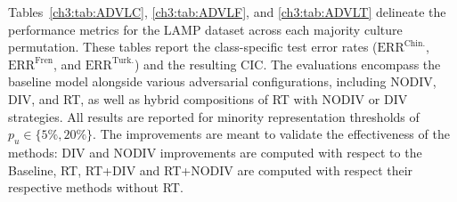 \label{ch3:sec:res:discr}
Tables~\ref{ch3:tab:ADVLC}, \ref{ch3:tab:ADVLF}, and \ref{ch3:tab:ADVLT} delineate the performance metrics for the LAMP dataset across each majority culture permutation. 
These tables report the class-specific test error rates ($\text{ERR}^{\text{Chin.}}$, $\text{ERR}^{\text{Fren}}$, and $\text{ERR}^{\text{Turk.}}$) and the resulting CIC. 
The evaluations encompass the baseline model alongside various adversarial configurations, including NODIV, DIV, and RT, as well as hybrid compositions of RT with NODIV or DIV strategies. 
All results are reported for minority representation thresholds of $p_u \in \{5\%, 20\%\}$.
The improvements are meant to validate the effectiveness of the methods: DIV and NODIV improvements are computed with respect to the Baseline, RT, RT+DIV and RT+NODIV are computed with respect their respective methods without RT.
%

